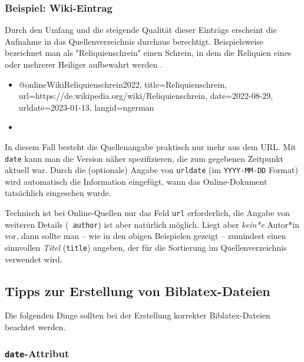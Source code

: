 \subsubsection{Beispiel: Wiki-Eintrag}
\label{sec:@online-www}

Durch den Umfang und die steigende Qualität dieser Einträge erscheint die
Aufnahme in das Quellenverzeichnis durchaus berechtigt. Beispielsweise
bezeichnet man als "Reliquienschrein" einen Schrein, in dem die Reliquien
eines oder mehrerer Heiliger aufbewahrt werden \cite{WikiReliquienschrein2022}.
%
\begin{itemize}
\item[]
\begin{GenericCode}[numbers=none]
@online{WikiReliquienschrein2022,
  title={Reliquienschrein},
  url={https://de.wikipedia.org/wiki/Reliquienschrein},
  date={2022-08-29},
  urldate={2023-01-13},
  langid={ngerman}
}
\end{GenericCode}
\item[\cite{WikiReliquienschrein2022}] 
\end{itemize}
%
In diesem Fall besteht die Quellenangabe praktisch nur mehr aus dem URL. Mit
\texttt{date} kann man die Version näher spezifizieren, die zum gegebenen
Zeitpunkt aktuell war. Durch die (optionale) Angabe von \texttt{urldate} (im
\texttt{YYYY-MM-DD} Format) wird automatisch die Information eingefügt, wann
das Online-Dokument tatsächlich eingesehen wurde.

Technisch ist bei Online-Quellen nur das Feld \texttt{url}
erforderlich, die Angabe von weiteren Details (\zB\ \texttt{author}) ist aber
natürlich möglich. Liegt aber \emph{kein*e} Autor*in vor, dann sollte man --
wie in den obigen Beispielen gezeigt -- zumindest einen sinnvollen
\emph{Titel} (\texttt{title}) angeben, der für die Sortierung im
Quellenverzeichnis verwendet wird.


\subsection{Tipps zur Erstellung von Biblatex-Dateien}
\label{sec:TippsZuBiblatex}

Die folgenden Dinge sollten bei der Erstellung korrekter Biblatex-Dateien
beachtet werden.

\subsubsection{\texttt{date}-Attribut}

